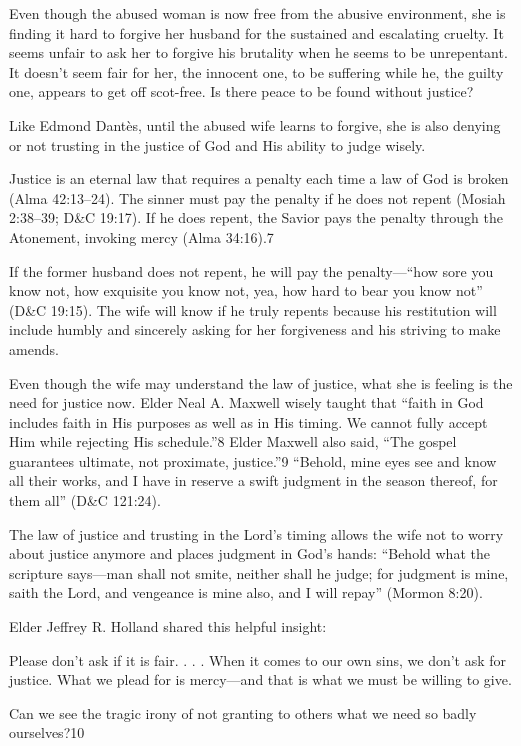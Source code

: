 \documentclass[letterpaper, 11pt]{report}
\begin{document}
Even though the abused woman is now free from the abusive environment, she is finding it hard to forgive her husband for the sustained and escalating cruelty. It seems unfair to ask her to forgive his brutality when he seems to be unrepentant. It doesn’t seem fair for her, the innocent one, to be suffering while he, the guilty one, appears to get off scot-free. Is there peace to be found without justice?

Like Edmond Dantès, until the abused wife learns to forgive, she is also denying or not trusting in the justice of God and His ability to judge wisely.

Justice is an eternal law that requires a penalty each time a law of God is broken (Alma 42:13–24). The sinner must pay the penalty if he does not repent (Mosiah 2:38–39; D\&C 19:17). If he does repent, the Savior pays the penalty through the Atonement, invoking mercy (Alma 34:16).7

If the former husband does not repent, he will pay the penalty—“how sore you know not, how exquisite you know not, yea, how hard to bear you know not” (D\&C 19:15). The wife will know if he truly repents because his restitution will include humbly and sincerely asking for her forgiveness and his striving to make amends.

Even though the wife may understand the law of justice, what she is feeling is the need for justice now. Elder Neal A. Maxwell wisely taught that “faith in God includes faith in His purposes as well as in His timing. We cannot fully accept Him while rejecting His schedule.”8 Elder Maxwell also said, “The gospel guarantees ultimate, not proximate, justice.”9 “Behold, mine eyes see and know all their works, and I have in reserve a swift judgment in the season thereof, for them all” (D\&C 121:24).

The law of justice and trusting in the Lord’s timing allows the wife not to worry about justice anymore and places judgment in God’s hands: “Behold what the scripture says—man shall not smite, neither shall he judge; for judgment is mine, saith the Lord, and vengeance is mine also, and I will repay” (Mormon 8:20).

Elder Jeffrey R. Holland shared this helpful insight:

Please don’t ask if it is fair. . . . When it comes to our own sins, we don’t ask for justice. What we plead for is mercy—and that is what we must be willing to give.

Can we see the tragic irony of not granting to others what we need so badly ourselves?10
\end{document}
